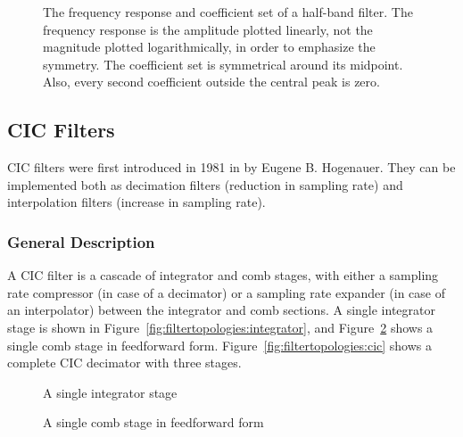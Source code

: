 \begin{figure}
    \centering
    
    \caption[Half-band Filter Frequency Response]{%
        The  frequency response  and coefficient  set of  a half-band  filter.
        The  frequency response  is the  amplitude plotted  linearly, not  the
        magnitude plotted logarithmically, in order to emphasize the symmetry.
        The coefficient  set is  symmetrical around its  midpoint. Also, every
        second coefficient outside the central peak is zero.%
    }
    \label{fig:fir:halfband_linear_example}
\end{figure}
%
%
\subsection{CIC Filters} %
\label{subsec:CIC_filters}

CIC  filters  were  first  introduced  in 1981  in  \cite{1163535}  by  Eugene
B. Hogenauer. They can be implemented both as decimation filters (reduction in
sampling rate)  and interpolation filters (increase  in sampling rate).

\subsubsection{General Description}
\label{subsubsec:cic:general_description}

A   CIC  filter   is  a   cascade  of   integrator  and   comb  stages,   with
either   a   sampling    rate   compressor   (in   case    of   a   decimator)
or   a    sampling   rate    expander   (in    case   of    an   interpolator)
between   the   integrator   and   comb   sections.    A   single   integrator
stage   is   shown    in   Figure~\ref{fig:filtertopologies:integrator},   and
Figure~\ref{fig:filtertopologies:comb}   shows   a   single  comb   stage   in
feedforward form. Figure~\ref{fig:filtertopologies:cic}  shows a  complete CIC
decimator with three stages.

\begin{figure}
    \centering
    \begin{minipage}[t][][b]{0.45\textwidth}
        \centering
        
        \caption[Integrator Stage]{A single integrator stage}
        \label{fig:filtertopologies:integrator}
    \end{minipage}
    \begin{minipage}[t][][b]{0.45\textwidth}
        \centering
        
        \caption[Comb Stage]{A single comb stage in feedforward form}
        \label{fig:filtertopologies:comb}
    \end{minipage}
\end{figure}

